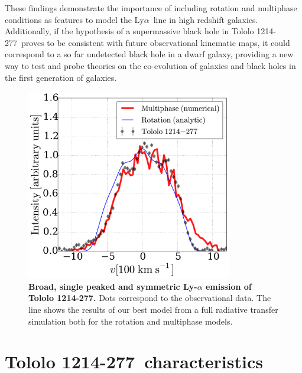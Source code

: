 \documentclass[a4paper, usenatbib, 12pt]{article}
\newcommand{\tol}{Tololo 1214-277}
\newcommand{\lya}{Ly$\alpha$}
\begin{document}
{These findings demonstrate the importance of including rotation and multiphase
conditions as features to model the \lya\ line in high redshift
galaxies.
Additionally, if the hypothesis of a supermassive black
hole in \tol\ proves to be consistent with future observational
kinematic maps, it could correspond to a so far undetected black hole
in a dwarf galaxy, providing a new way to test and probe
theories on the co-evolution of galaxies and black holes in the first
generation of galaxies.  

\begin{figure}
\begin{center}
\includegraphics[width=0.8\textwidth]{CLARA-TOL-main.pdf}
\caption{{\bf Broad, single peaked and symmetric Ly-$\alpha$ emission of \tol.}
  Dots correspond to the observational data. The line shows the results
of our best model from a full radiative transfer simulation both for
the rotation and multiphase models.} 
\end{center}
\end{figure}

{}


\newpage 

\section*{\tol\ characteristics}


}
\end{document}
